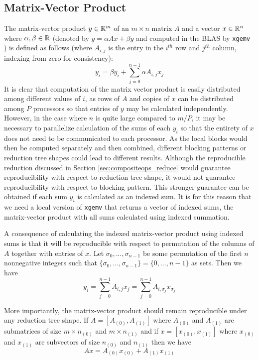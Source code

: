 \subsection{Matrix-Vector Product}
  \label{sec:compositeops_gemv}
  The matrix-vector product $y \in \mathbb{R}^m$ of an $m \times n$ matrix $A$ and a vector $x \in \mathbb{R}^n$ where $\alpha, \beta \in \mathbb{R}$ (denoted by $y = \alpha Ax + \beta y$ and computed in the BLAS by \texttt{xgemv} \cite{BLAS}) is defined as follows (where $A_{i, j}$ is the entry in the $i^{th}$ row and $j^{th}$ column, indexing from zero for consistency):
  \[
    y_i = \beta y_i + \sum\limits_{j = 0}^{n - 1} \alpha A_{i, j}x_j
  \]
  It is clear that computation of the matrix vector product is easily distributed among different values of $i$, as rows of $A$ and copies of $x$ can be distributed among $P$ processors so that entries of $y$ may be calculated independently.
  However, in the case where $n$ is quite large compared to $m/P$, it may be necessary to parallelize calculation of the sums of each $y_i$ so that the entirety of $x$ does not need to be communicated to each processor.
  As the local blocks would then be computed separately and then combined, different blocking patterns or reduction tree shapes could lead to different results.
  Although the reproducible reduction discussed in Section \ref{sec:compositeops_reduce} would guarantee reproducibility with respect to reduction tree shape, it would not guarantee reproducibility with respect to blocking pattern. This stronger guarantee can be obtained if each sum $y_i$ is calculated as an indexed sum.
  It is for this reason that we need a local version of \texttt{xgemv} that returns a vector of indexed sums, the matrix-vector product with all sums calculated using indexed summation.

  A consequence of calculating the indexed matrix-vector product using indexed sums is that it will be reproducible with respect to permutation of the columns of $A$ together with entries of $x$.
  Let $\sigma_0, ..., \sigma_{n - 1}$ be some permutation of the first $n$ nonnegative integers such that $\{\sigma_0, ..., \sigma_{n - 1}\} = \{0, ..., n - 1\}$ as sets. Then we have
  \[
    y_i = \sum\limits_{j = 0}^{n - 1} A_{i, j}x_j = \sum\limits_{j = 0}^{n - 1} A_{i, \sigma_j}x_{\sigma_j}
  \]

  More importantly, the matrix-vector product should remain reproducible under any reduction tree shape.
  If $A = [A_{(0)}, A_{(1)}]$ where $A_{(0)}$ and $A_{(1)}$ are submatrices of size $m \times n_{(0)}$ and $m \times n_{(1)}$ and if $x = [x_{(0)}, x_{(1)}]$ where $x_{(0)}$ and $x_{(1)}$ are subvectors of size $n_{(0)}$ and $n_{(1)}$ then we have 
  \[
    Ax = A_{(0)}x_{(0)} + A_{(1)}x_{(1)}
  \]

